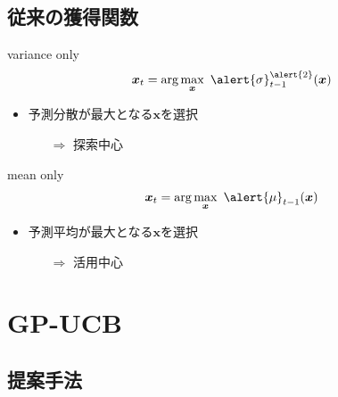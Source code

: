 \documentclass[dvipdfmx, 10.5pt]{beamer}
\begin{document}
\subsection{従来の獲得関数}
\begin{frame}{\insertsubsection}
	\begin{block}{variance only}
		\begin{align*}
			\bm x_t = \arg \max_{\bm x} ~ \alert{\sigma}_{t-1}^{\alert{2}}(\bm x)
		\end{align*}
	\end{block}
	\begin{itemize}
		\item 予測分散が最大となる$\bm x$を選択
		\begin{itemize}
			\item[$\Rightarrow$] \alert{探索}中心
		\end{itemize}
	\end{itemize}
	\begin{block}{mean only}
		\begin{align*}
			\bm x_t = \arg \max_{\bm x} ~ \alert{\mu}_{t-1}(\bm x)
		\end{align*}
	\end{block}
	\begin{itemize}
		\item 予測平均が最大となる$\bm x$を選択
		\begin{itemize}
			\item[$\Rightarrow$] \alert{活用}中心
		\end{itemize}
	\end{itemize}
\end{frame}

\section{GP-UCB}

\subsection{提案手法}
\end{document}
